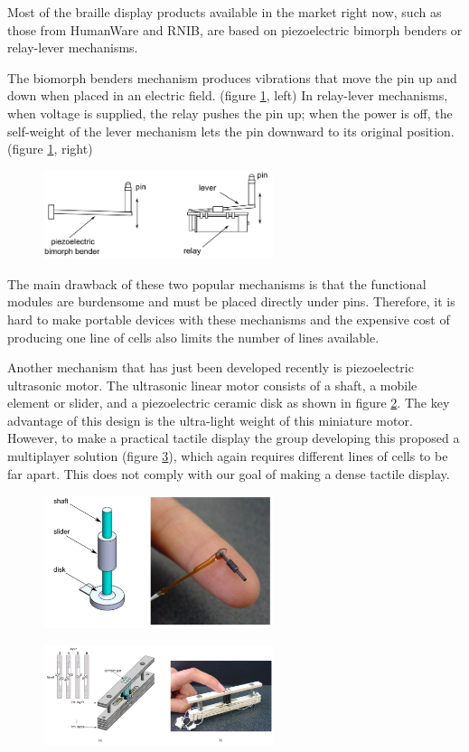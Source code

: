 Most of the braille display products available in the market right now, such as those from HumanWare and RNIB, are based on piezoelectric bimorph benders or relay-lever mechanisms.  

The biomorph benders mechanism produces vibrations that move the pin up and down when placed in an electric field. (figure \ref{fig:piezo-bender}, left) In relay-lever mechanisms, when voltage is supplied, the relay pushes the pin up; when the power is off, the self-weight of the lever mechanism lets the pin downward to its original position. (figure \ref{fig:piezo-bender}, right)

\begin{figure} \centering
    \includegraphics[width=0.6\textwidth]{figures/piezo-bender.png}
\caption{}
\label{fig:piezo-bender}
\end{figure}

The main drawback of these two popular mechanisms is that the functional modules are burdensome and must be placed directly under pins. Therefore, it is hard to make portable devices with these mechanisms and the expensive cost of producing one line of cells also limits the number of lines available. 

Another mechanism that has just been developed recently is piezoelectric ultrasonic motor.
The ultrasonic linear motor consists of a shaft, a mobile element or slider, and a piezoelectric ceramic disk as shown in figure \ref{fig:piezo-miniature}.
The key advantage of this design is the ultra-light weight of this miniature motor.
However, to make a practical tactile display the group developing this proposed a multiplayer solution (figure \ref{fig:piezo-full-design}), which again requires different lines of cells to be far apart. This does not comply with our goal of making a dense tactile display.

\begin{figure} \centering
    \includegraphics[width=0.6\textwidth]{figures/piezo-miniature.png}
\caption{}
\label{fig:piezo-miniature}
\end{figure}

\begin{figure}\centering
    \includegraphics[width=0.6\textwidth]{figures/piezo-full-design.png}
\caption{}
\label{fig:piezo-full-design}
\end{figure}